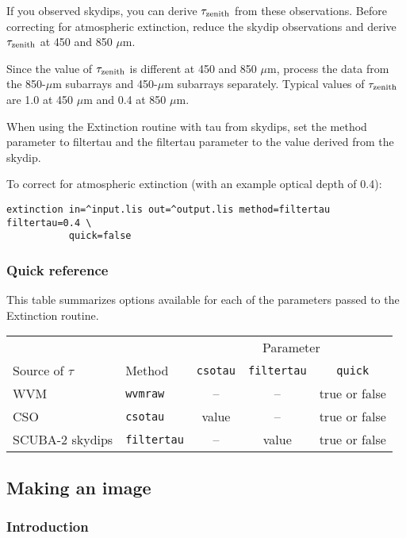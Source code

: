 \documentclass[twoside,11pt]{article}
\renewcommand{\_}{\texttt{\symbol{95}}}
\begin{document}
If you observed skydips, you can derive $\tau_{\rm zenith}$ from these
observations. Before correcting for atmospheric extinction, reduce the
skydip observations and derive $\tau_{\rm zenith}$ at 450 and 850 $\mu$m.

Since the value of $\tau_{\rm zenith}$ is different at 450 and 850
$\mu$m, process the data from the 850-$\mu$m subarrays and 450-$\mu$m
subarrays separately. Typical values of $\tau_{\rm zenith}$ are 1.0 at
450 $\mu$m and 0.4 at 850 $\mu$m.

When using the Extinction routine with tau from skydips, set the
method parameter to filtertau and the filtertau parameter to the value
derived from the skydip.

To correct for atmospheric extinction (with an example optical depth
of 0.4):
\begin{verbatim}
extinction in=^input.lis out=^output.lis method=filtertau filtertau=0.4 \
           quick=false
\end{verbatim}

\subsubsection{Quick reference}

This table summarizes options available for each of the parameters
passed to the Extinction routine.

\begin{table}
\begin{tabular}{llccc}
\hline
                 &           & \multicolumn{3}{c}{Parameter} \\
Source of $\tau$ & Method    & \verb+csotau+ & \verb+filtertau+ & \verb+quick+ \\
\hline                                               
WVM              & \verb+wvmraw+    &  --     &   --       & true or false \\
CSO              & \verb+csotau+    & value   &   --       & true or false \\
SCUBA-2 skydips  & \verb+filtertau+ &  --     & value      & true or false \\
\hline
\end{tabular}
\end{table}

\subsection{Making an image}

\subsubsection{Introduction}
\end{document}
